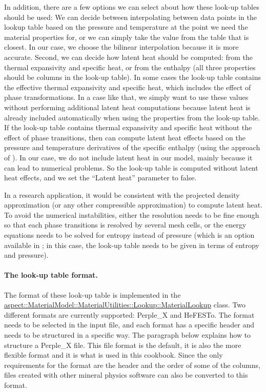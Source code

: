 In addition, there are a few options we can select about how these look-up tables should be used:
We can decide between interpolating between data points in the lookup table based on the pressure and temperature at the point we need the material properties for, or we can simply take the value from the table that is closest. In our case, we choose the bilinear interpolation because it is more accurate. 
Second, we can decide how latent heat should be computed: from the thermal expansivity and specific heat, 
or from the enthalpy (all three properties should be columns in the look-up table). 
In some cases the look-up table contains the effective thermal expansivity and specific heat, which includes the effect of phase transformations. In a case like that, we simply want to use these values without performing additional latent heat computations because latent heat is already included automatically when using the properties from the look-up table. 
If the look-up table contains thermal expansivity and specific heat without the effect of phase transitions, then \aspect{} can compute latent heat effects based on the pressure and 
temperature derivatives of the specific enthalpy (using the approach of \cite{nakagawa2009incorporating}).
In our case, we do not include latent heat in our model, mainly because it can lead to numerical problems.
So the look-up table is computed without latent heat effects, and we set the ``Latent heat'' parameter to false. 

In a research application, it would be consistent with the projected density approximation (or any other compressible approximation) to compute latent heat. To avoid the numerical instabilities, either the resolution needs to be fine enough so that each phase transitions is resolved by several mesh cells, 
or the energy equations needs to be solved for entropy instead of pressure (which is an option available in \aspect{}; in this case, the look-up table needs to be given in terms of entropy and pressure). 

\paragraph{The look-up table format.}
The format of these look-up table is implemented in the \href{https://aspect.geodynamics.org/doc/doxygen/classaspect_1_1MaterialModel_1_1MaterialUtilities_1_1Lookup_1_1MaterialLookup.html}{aspect::MaterialModel::MaterialUtilities::Lookup::MaterialLookup} class. 
Two different formats are currently supported: Perple\_X and HeFESTo. 
The format needs to be selected in the input file, and each format has a specific header and needs to be structured in a specific way. The paragraph below explains how to structure a Perple\_X file. 
This file format is the default, it is also the more flexible format and it is what is used in this cookbook. Since the only requirements for the format are the header and the order of some of the columns, 
files created with other mineral physics software can also be converted to this format.  

